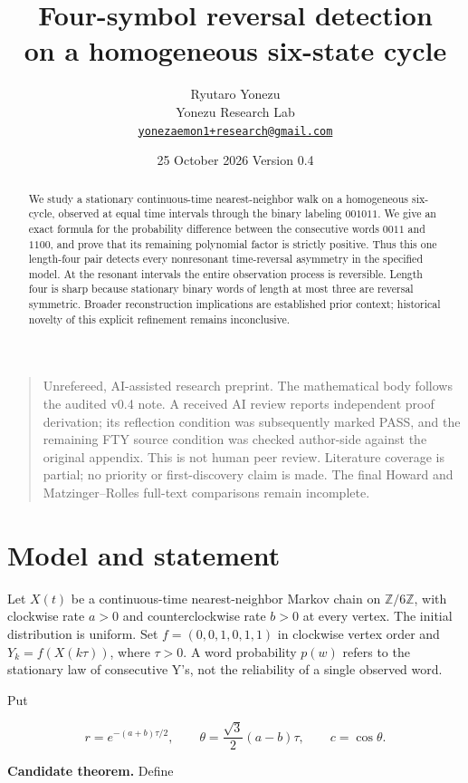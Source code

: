 \documentclass[11pt,a4paper]{article}
\title{Four-symbol reversal detection\\on a homogeneous six-state cycle}
\author{Ryutaro Yonezu\\\small Yonezu Research Lab\\\small\href{mailto:yonezaemon1+research@gmail.com}{\texttt{yonezaemon1+research@gmail.com}}}
\date{25 October 2026 \quad Version 0.4}
\begin{document}
\maketitle
\begin{abstract}
We study a stationary continuous-time nearest-neighbor walk on a homogeneous
six-cycle, observed at equal time intervals through the binary labeling
$001011$. We give an exact formula for the probability difference between
the consecutive words $0011$ and $1100$, and prove that its remaining
polynomial factor is strictly positive. Thus this one length-four pair
detects every nonresonant time-reversal asymmetry in the specified model.
At the resonant intervals the entire observation process is reversible.
Length four is sharp because stationary binary words of length at most
three are reversal symmetric. Broader reconstruction implications are
established prior context; historical novelty of this explicit refinement
remains inconclusive.
\end{abstract}
\begin{quote}\small
Unrefereed, AI-assisted research preprint. The mathematical body follows the
audited v0.4 note. A received AI review reports independent proof derivation;
its reflection condition was subsequently marked PASS, and the remaining
FTY source condition was checked author-side against the original appendix.
This is not human peer review. Literature coverage is partial; no priority
or first-discovery claim is made. The final Howard and Matzinger--Rolles
full-text comparisons remain incomplete.
\end{quote}
\hypertarget{model-and-statement}{%
\section{Model and statement}\label{model-and-statement}}

Let \(X(t)\) be a continuous-time nearest-neighbor Markov chain on
\(\mathbb{Z}/6\mathbb{Z}\), with clockwise rate \(a>0\) and
counterclockwise rate \(b>0\) at every vertex. The initial distribution
is uniform. Set \(f=(0,0,1,0,1,1)\) in clockwise vertex order and
\(Y_k=f(X(k\tau))\), where \(\tau>0\). A word probability \(p(w)\)
refers to the stationary law of consecutive Y's, not the reliability of
a single observed word.

Put

\[r=e^{-(a+b)\tau/2},\qquad
\theta=\frac{\sqrt3}{2}(a-b)\tau,\qquad c=\cos\theta.\]

\textbf{Candidate theorem.} Define
\end{document}
